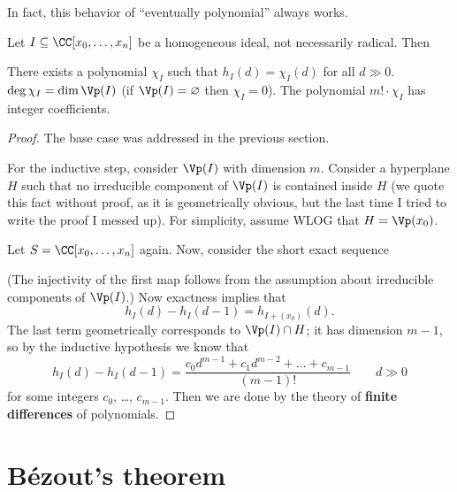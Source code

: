 In fact, this behavior of ``eventually polynomial'' always works.
\begin{theorem}
	Let $I \subseteq \CC[x_0, \dots, x_n]$ be a homogeneous ideal,
	not necessarily radical. Then
	\begin{enumerate}[(a)]
		\ii There exists a polynomial $\chi_I$ such that
		$h_I(d) = \chi_I(d)$ for all $d \gg 0$.
		\ii $\deg \chi_I = \dim\Vp(I)$ (if $\Vp(I) = \varnothing$
		then $\chi_I = 0$).
		\ii The polynomial $m! \cdot \chi_I$ has integer coefficients.
	\end{enumerate}
\end{theorem}
\begin{proof}
	The base case was addressed in the previous section.

	For the inductive step, consider $\Vp(I)$ with dimension $m$.
	Consider a hyperplane $H$ such that no irreducible
	component of $\Vp(I)$ is contained inside $H$
	(we quote this fact without proof, as it is geometrically obvious,
	but the last time I tried to write the proof I messed up).
	For simplicity, assume WLOG that $H = \Vp(x_0)$.

	Let $S = \CC[x_0, \dots, x_n]$ again.
	Now, consider the short exact sequence
	\begin{center}
	\end{center}
	(The injectivity of the first map follows from the assumption
	about irreducible components of $\Vp(I)$.)
	Now exactness implies that
	\[ h_I(d) - h_I(d-1) = h_{I + (x_0)}(d). \]
	The last term geometrically corresponds to $\Vp(I) \cap H$;
	it has dimension $m-1$, so by the inductive hypothesis
	we know that
	\[ h_I(d) - h_I(d-1)
		= \frac{c_0 d^{m-1} + c_1 d^{m-2} + \dots + c_{m-1}}{(m-1)!}
		\qquad d \gg 0 \]
	for some integers $c_0$, \dots, $c_{m-1}$.
	Then we are done by the theory of
	\textbf{finite differences} of polynomials.
\end{proof}

\section{B\'ezout's theorem}

